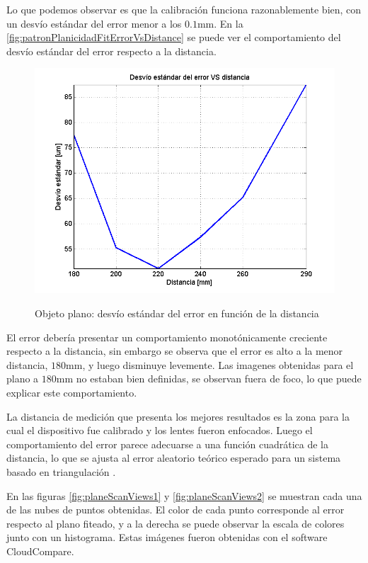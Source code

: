 Lo que podemos observar es que la calibración funciona razonablemente bien, con un desvío estándar del error menor a los $0.1$mm. En la \autoref{fig:patronPlanicidadFitErrorVsDistance} se puede ver el comportamiento del desvío estándar del error respecto a la distancia.

\begin{figure}[!bth]
    \myfloatalign
        {\includegraphics[width=1.0\linewidth]{scans/plotPlaneSD}}
        \caption{Objeto plano: desvío estándar del error en función de la distancia}
        \label{fig:patronPlanicidadFitErrorVsDistance}
\end{figure}

El error debería presentar un comportamiento monotónicamente creciente respecto a la distancia, sin embargo se observa que el error es alto a la menor distancia, $180$mm, y luego disminuye levemente. Las imagenes obtenidas para el plano a $180$mm no estaban bien definidas, se observan fuera de foco, lo que puede explicar este comportamiento.

La distancia de medición que presenta los mejores resultados es la zona para la cual el dispositivo fue calibrado y los lentes fueron enfocados. Luego el comportamiento del error parece adecuarse a una función cuadrática de la distancia, lo que se ajusta al error aleatorio teórico esperado para un sistema basado en triangulación \cite{khoshelham2012accuracy}.

En las figuras \ref{fig:planeScanViews1} y \ref{fig:planeScanViews2} se muestran cada una de las nubes de puntos obtenidas. El color de cada punto corresponde al error respecto al plano fiteado, y a la derecha se puede observar la escala de colores junto con un histograma. Estas imágenes fueron obtenidas con el software CloudCompare.



